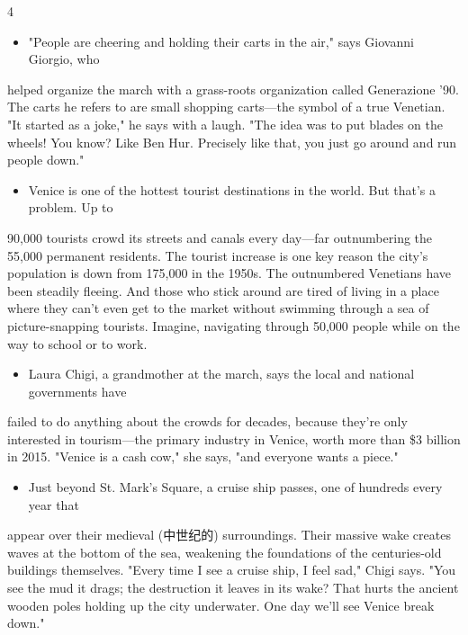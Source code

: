 \documentclass[UTF8,11pt]{ctexart}
\begin{document}
4


\begin{itemize}[leftmargin=2em,itemsep=.2em,topsep=.4em]\item[B.] "People are cheering and holding their carts in the air," says Giovanni Giorgio, who
\end{itemize}

helped organize the march with a grass-roots organization called Generazione '90. The carts he refers to are small shopping carts—the symbol of a true Venetian. "It started as a joke," he says with a laugh. "The idea was to put blades on the wheels! You know? Like Ben Hur. Precisely like that, you just go around and run people down."


\begin{itemize}[leftmargin=2em,itemsep=.2em,topsep=.4em]\item[C.] Venice is one of the hottest tourist destinations in the world. But that's a problem. Up to
\end{itemize}

90,000 tourists crowd its streets and canals every day—far outnumbering the 55,000 permanent residents. The tourist increase is one key reason the city's population is down from 175,000 in the 1950s. The outnumbered Venetians have been steadily fleeing. And those who stick around are tired of living in a place where they can't even get to the market without swimming through a sea of picture-snapping tourists. Imagine, navigating through 50,000 people while on the way to school or to work.


\begin{itemize}[leftmargin=2em,itemsep=.2em,topsep=.4em]\item[D.] Laura Chigi, a grandmother at the march, says the local and national governments have
\end{itemize}

failed to do anything about the crowds for decades, because they're only interested in tourism—the primary industry in Venice, worth more than \$3 billion in 2015. "Venice is a cash cow," she says, "and everyone wants a piece."


\begin{itemize}[leftmargin=2em,itemsep=.2em,topsep=.4em]\item[E.] Just beyond St. Mark's Square, a cruise ship passes, one of hundreds every year that
\end{itemize}

appear over their medieval (中世纪的) surroundings. Their massive wake creates waves at the bottom of the sea, weakening the foundations of the centuries-old buildings themselves. "Every time I see a cruise ship, I feel sad," Chigi says. "You see the mud it drags; the destruction it leaves in its wake? That hurts the ancient wooden poles holding up the city underwater. One day we'll see Venice break down."
\end{document}
